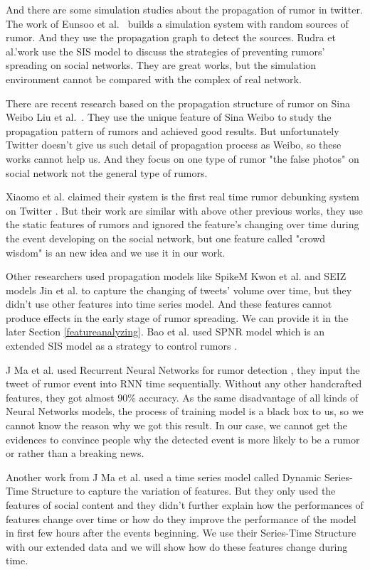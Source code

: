 And there are some simulation studies about the propagation of rumor in twitter. The work of Eunsoo et al.~\cite{seo2012identifying} builds a simulation system with random sources of rumor. And they use the propagation graph to detect the sources. Rudra et al.'work \cite{tripathy2010study} use the SIS model to discuss the strategies of preventing rumors' spreading on social networks. They are great works, but the simulation environment cannot be compared with the complex of real network.

There are recent research based on the propagation structure of rumor on Sina Weibo Liu et al.~\cite{wu2015false}. They use the unique feature of Sina Weibo to study the propagation pattern of rumors and achieved good results. But unfortunately Twitter doesn't give us such detail of propagation process as Weibo, so these works cannot help us. And they focus on one type of rumor "the false photos" on social network not the general type of rumors.  

Xiaomo et al. claimed their system is the first real time rumor debunking system on Twitter \cite{liu2015real}. But their work are similar with above other previous works, they use the static features of rumors and ignored the feature's changing over time during the event developing on the social network, but one feature called "crowd wisdom" is an new idea and we use it in our work.


Other researchers used propagation models like SpikeM \cite{kwon2013prominent} Kwon et al. and SEIZ models \cite{jin2013epidemiological} Jin et al. to capture the changing of tweets' volume over time, but they didn't use other features into time series model. And these features cannot produce effects in the early stage of rumor spreading. We can provide it in the later Section \ref{featureanalyzing}. Bao et al. used SPNR model which is an extended SIS model as a strategy to control rumors \cite{bao2013new}. 

J Ma et al. used Recurrent Neural Networks for rumor detection \cite{madetecting}, they input the tweet of rumor event into RNN time sequentially. Without any other handcrafted features, they got almost 90\% accuracy.
As the same disadvantage of all kinds of Neural Networks models, the process of training model is a black box to us, so we cannot know the reason why we got this result. In our case, we cannot get the evidences to convince people why the detected event is more likely to be a rumor or rather than a breaking news. 

Another work from J Ma et al. used a time series model called Dynamic Series-Time Structure \cite{ma2015detect} to capture the variation of features. But they only used the features of social content and they didn't further explain how the performances of features change over time or how do they improve the performance of the model in first few hours after the events beginning.  We use their Series-Time Structure with our extended data and we will show how do these features change during time. 

